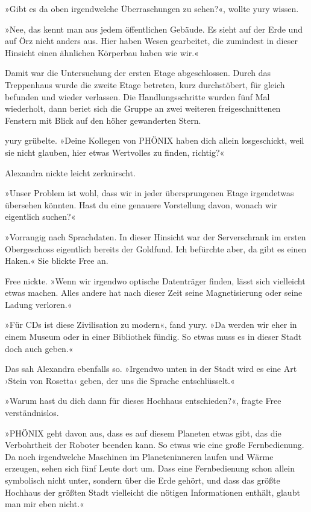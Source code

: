 »Gibt es da oben irgendwelche Überraschungen zu sehen?«, wollte yury wissen.

»Nee, das kennt man aus jedem öffentlichen Gebäude. Es sieht auf der Erde und auf Örz nicht anders aus. Hier haben Wesen gearbeitet, die zumindest in dieser Hinsicht einen ähnlichen Körperbau haben wie wir.«

Damit war die Untersuchung der ersten Etage abgeschlossen. Durch das Treppenhaus wurde die zweite Etage betreten, kurz durchstöbert, für gleich befunden und wieder verlassen. Die Handlungsschritte wurden fünf Mal wiederholt, dann beriet sich die Gruppe an zwei weiteren freigeschnittenen Fenstern mit Blick auf den höher gewanderten Stern.

yury grübelte. »Deine Kollegen von PHÖNIX haben dich allein losgeschickt, weil sie nicht glauben, hier etwas Wertvolles zu finden, richtig?«

Alexandra nickte leicht zerknirscht.

»Unser Problem ist wohl, dass wir in jeder übersprungenen Etage irgendetwas übersehen könnten. Hast du eine genauere Vorstellung davon, wonach wir eigentlich suchen?«

»Vorrangig nach Sprachdaten. In dieser Hinsicht war der Serverschrank im ersten Obergeschoss eigentlich bereits der Goldfund. Ich befürchte aber, da gibt es einen Haken.« Sie blickte Free an.

Free nickte. »Wenn wir irgendwo optische Datenträger finden, lässt sich vielleicht etwas machen. Alles andere hat nach dieser Zeit seine Magnetisierung oder seine Ladung verloren.«

»Für CDs ist diese Zivilisation zu modern«, fand yury. »Da werden wir eher in einem Museum oder in einer Bibliothek fündig. So etwas muss es in dieser Stadt doch auch geben.«

Das sah Alexandra ebenfalls so. »Irgendwo unten in der Stadt wird es eine Art ›Stein von Rosetta‹ geben, der uns die Sprache entschlüsselt.«

»Warum hast du dich dann für dieses Hochhaus entschieden?«, fragte Free verständnislos.

»PHÖNIX geht davon aus, dass es auf diesem Planeten etwas gibt, das die Verbohrtheit der Roboter beenden kann. So etwas wie eine große Fernbedienung. Da noch irgendwelche Maschinen im Planeteninneren laufen und Wärme erzeugen, sehen sich fünf Leute dort um. Dass eine Fernbedienung schon allein symbolisch nicht unter, sondern über die Erde gehört, und dass das größte Hochhaus der größten Stadt vielleicht die nötigen Informationen enthält, glaubt man mir eben nicht.«


